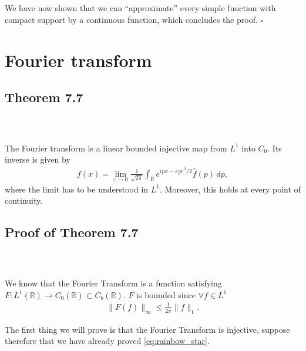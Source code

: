 \documentclass{beamer}
\numberwithin{equation}{section}
\begin{document}
\begin{frame}\frametitle{{\normalsize \secname} \\ {\large \subsecname}}
    We have now shown that we can ``approximate'' every simple function with compact support by a continuous function, which concludes the proof. \hfill $\square$
\end{frame}

\section{Fourier transform}

\subsection{Theorem 7.7}

\begin{frame}\frametitle{{\normalsize \secname} \\ {\large \subsecname}}
    \begin{theorem}[7.7]
        The Fourier transform is a linear bounded injective map from $L^1$ into $C_0$.
        Its inverse is given by
        \begin{align}\label{eq:rainbow_star}
            f(x) = \lim_{\varepsilon \rightarrow 0} \frac{1}{\sqrt{2 \pi}} \int_\mathbb{R} e^{ipx - \varepsilon |p|^2/2} \hat{f}(p) \, dp,
        \end{align}
        where the limit has to be understood in $L^1$.
        Moreover, this holds at every point of continuity.
    \end{theorem}
\end{frame}

\subsection{Proof of Theorem 7.7}

\begin{frame}\frametitle{{\normalsize \secname} \\ {\large \subsecname}}
    We know that the Fourier Transform is a function satisfying $F: L^1 (\mathbb{R}) \rightarrow C_0(\mathbb{R}) \subset C_b (\mathbb{R})$.
    $F$ is bounded since $\forall f \in L^1$
    \begin{align}
        \| F(f) \|_\infty \leq \frac{1}{2 \pi}\|f\|_1.
    \end{align}
    \vspace{1em}

    The first thing we will prove is that the Fourier Transform is injective, suppose therefore that we have already proved \eqref{eq:rainbow_star}.
\end{frame}
\end{document}
